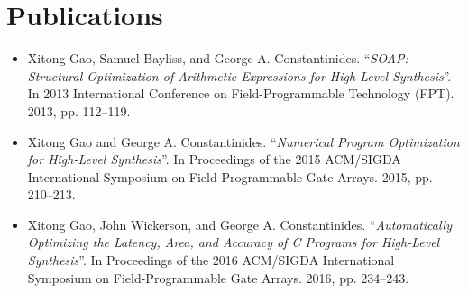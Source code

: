 \section{Publications}
\label{intro:sec:publications}

\begin{itemize}
    \item
        Xitong Gao, Samuel Bayliss, and George A. Constantinides.
        ``\emph{SOAP\@: Structural Optimization of Arithmetic Expressions
        for High-Level Synthesis}''. In 2013 International Conference on
        Field-Programmable Technology (FPT). 2013, pp. 112–119.

    \item
        Xitong Gao and George A. Constantinides. ``\emph{Numerical Program
        Optimization for High-Level Synthesis}''. In Proceedings of the
        2015 ACM/SIGDA International Symposium on Field-Programmable Gate
        Arrays. 2015, pp. 210–213.

    \item
        Xitong Gao, John Wickerson, and George A. Constantinides.
        ``\emph{Automatically Optimizing the Latency, Area, and Accuracy
        of C Programs for High-Level Synthesis}''. In Proceedings of the
        2016 ACM/SIGDA International Symposium on Field-Programmable Gate
        Arrays. 2016, pp. 234–243.
\end{itemize}
